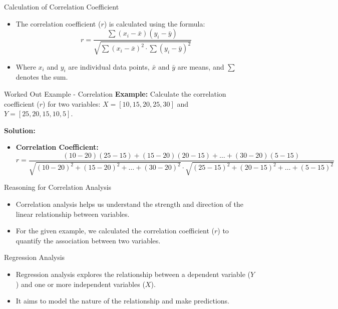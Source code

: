 \begin{frame}{Calculation of Correlation Coefficient}
  \begin{itemize}
    \item The correlation coefficient (\(r\)) is calculated using the formula:
    \[ r = \frac{\sum{(x_i - \bar{x})(y_i - \bar{y})}}{\sqrt{\sum{(x_i - \bar{x})^2} \cdot \sum{(y_i - \bar{y})^2}}} \]
    \item Where \(x_i\) and \(y_i\) are individual data points, \(\bar{x}\) and \(\bar{y}\) are means, and \(\sum\) denotes the sum.
  \end{itemize}
\end{frame}

\begin{frame}{Worked Out Example - Correlation}
  \textbf{Example:} Calculate the correlation coefficient (\(r\)) for two variables: \(X = [10, 15, 20, 25, 30]\) and \(Y = [25, 20, 15, 10, 5]\).

  \textbf{Solution:}
  \begin{itemize}
    \item \textbf{Correlation Coefficient:} \[ r = \frac{(10-20)(25-15) + (15-20)(20-15) + \ldots + (30-20)(5-15)}{\sqrt{(10-20)^2 + (15-20)^2 + \ldots + (30-20)^2} \cdot \sqrt{(25-15)^2 + (20-15)^2 + \ldots + (5-15)^2}} \]
  \end{itemize}
\end{frame}

\begin{frame}{Reasoning for Correlation Analysis}
  \begin{itemize}
    \item Correlation analysis helps us understand the strength and direction of the linear relationship between variables.
    \item For the given example, we calculated the correlation coefficient (\(r\)) to quantify the association between two variables.
  \end{itemize}
\end{frame}

\begin{frame}{Regression Analysis}
  \begin{itemize}
    \item Regression analysis explores the relationship between a dependent variable (\(Y\)) and one or more independent variables (\(X\)).
    \item It aims to model the nature of the relationship and make predictions.
  \end{itemize}
\end{frame}

